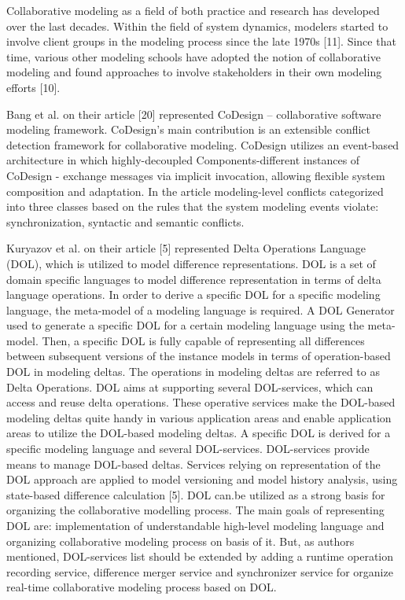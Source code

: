 
Collaborative modeling as a field of both practice and research has developed over the last decades. Within the field of system dynamics, modelers started to involve client groups in the modeling process since the late 1970s [11]. Since that time, various other modeling schools have adopted the notion of collaborative modeling and found approaches to involve stakeholders in their own modeling efforts [10].

Bang et al. on their article [20] represented CoDesign – collaborative software modeling framework. CoDesign's main contribution is an extensible conflict detection framework for collaborative modeling. CoDesign utilizes an event-based architecture in which highly-decoupled Components-different instances of CoDesign - exchange messages via implicit invocation, allowing flexible system composition and adaptation. In the article modeling-level conflicts categorized into three classes based on the rules that the system modeling events violate: synchronization, syntactic and semantic conflicts. 



Kuryazov et al. on their article [5] represented Delta Operations Language (DOL), which is utilized to model difference representations. DOL is a set of domain specific languages to model difference representation in terms of delta language operations. In order to derive a specific DOL for a specific modeling language, the meta-model of a modeling language is required. A DOL Generator used to generate a specific DOL for a certain modeling language using the meta-model. Then, a specific DOL is fully capable of representing all differences between subsequent versions of the instance models in terms of operation-based DOL in modeling deltas. The operations in modeling deltas are referred to as Delta Operations. DOL aims at supporting several DOL-services, which can access and reuse delta operations. These operative services make the DOL-based modeling deltas quite handy in various application areas and enable application areas to utilize the DOL-based modeling deltas. A specific DOL is derived for a specific modeling language and several DOL-services. DOL-services provide means to manage DOL-based deltas. Services relying on representation of the DOL approach are applied to model versioning and model history analysis, using state-based difference calculation [5]. DOL can.be utilized as a strong basis for organizing the collaborative modelling process. The main goals of representing DOL are: implementation of understandable high-level modeling language and organizing collaborative modeling process on basis of it. But, as authors mentioned, DOL-services list should be extended by adding a runtime operation recording service, difference merger service and synchronizer service for organize real-time collaborative modeling process based on DOL.